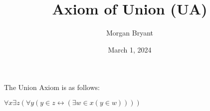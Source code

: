 \documentclass[a4paper]{article}
\title{Axiom of Union (UA)}
\date{March 1, 2024}
\author{Morgan Bryant}
\begin{document}
\maketitle
\par{The Union Axiom is as follows:}\par{\(\forall  x  \exists  z( \forall  y( y \in  z  \leftrightarrow  ( \exists  w  \in  x (y \in  w))))\)}
\printbibliography
\end{document}

